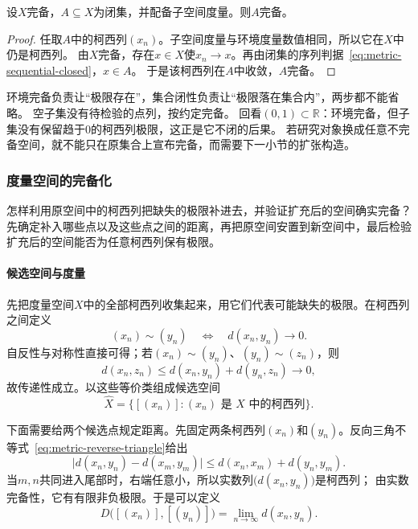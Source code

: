 \begin{theorem}[完备空间的闭子集完备]
\label{thm:metric-closed-subspace-complete}
设$X$完备，$A\subseteq X$为闭集，并配备子空间度量。则$A$完备。
\end{theorem}

\begin{proof}
任取$A$中的柯西列$(x_n)$。子空间度量与环境度量数值相同，所以它在$X$中仍是柯西列。
由$X$完备，存在$x\in X$使$x_n\to x$。再由闭集的序列判据~\eqref{eq:metric-sequential-closed}，$x\in A$。
于是该柯西列在$A$中收敛，$A$完备。
\end{proof}

环境完备负责让“极限存在”，集合闭性负责让“极限落在集合内”，两步都不能省略。
空子集没有待检验的点列，按约定完备。
回看$(0,1)\subset\mathbb R$：环境完备，但子集没有保留趋于$0$的柯西列极限，这正是它不闭的后果。
若研究对象换成任意不完备空间，就不能只在原集合上宣布完备，而需要下一小节的扩张构造。

\subsubsection{度量空间的完备化}
\label{sec:metric-closed-subspaces-completion}

怎样利用原空间中的柯西列把缺失的极限补进去，并验证扩充后的空间确实完备？
先确定补入哪些点以及这些点之间的距离，再把原空间安置到新空间中，最后检验扩充后的空间能否为任意柯西列保有极限。

\paragraph{候选空间与度量}

先把度量空间$X$中的全部柯西列收集起来，用它们代表可能缺失的极限。在柯西列之间定义
\[
  (x_n)\sim(y_n)\quad\Longleftrightarrow\quad d(x_n,y_n)\to0.
\]
自反性与对称性直接可得；若$(x_n)\sim(y_n)$、$(y_n)\sim(z_n)$，则
\[
  d(x_n,z_n)\leq d(x_n,y_n)+d(y_n,z_n)\to0,
\]
故传递性成立。以这些等价类组成候选空间
\[
  \widehat X=\bigl\{[(x_n)]:(x_n)\text{ 是 }X\text{ 中的柯西列}\bigr\}.
\]

下面需要给两个候选点规定距离。先固定两条柯西列$(x_n)$和$(y_n)$。反向三角不等式~\eqref{eq:metric-reverse-triangle}给出
\[
  \bigl|d(x_n,y_n)-d(x_m,y_m)\bigr|
  \leq d(x_n,x_m)+d(y_n,y_m).
\]
当$m,n$共同进入尾部时，右端任意小，所以实数列$\bigl(d(x_n,y_n)\bigr)$是柯西列；
由实数完备性，它有有限非负极限。于是可以定义
\begin{equation}
\label{eq:metric-completion-distance}
  D\bigl([(x_n)],[(y_n)]\bigr)=\lim_{n\to\infty}d(x_n,y_n).
\end{equation}


